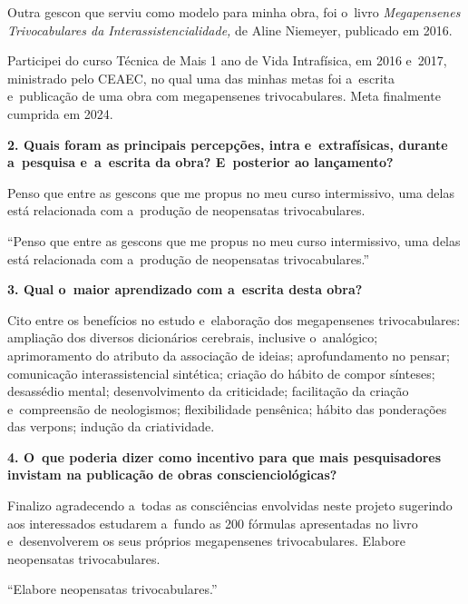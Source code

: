 \documentclass{gescons}
\begin{document}
\begin{multicols}{2}
Outra gescon que serviu como modelo  para minha obra, foi o~livro \textit{Megapensenes Trivocabulares da Interassistencialidade,} de Aline Niemeyer, publicado em 2016.

Participei do curso Técnica de Mais 1 ano de Vida Intrafísica, em 2016 e~2017,  ministrado pelo CEAEC, no qual uma das minhas metas foi a~escrita e~publicação de uma obra com megapensenes trivocabulares. Meta finalmente cumprida em 2024.

\textbf{2.       Quais foram as principais percepções, intra e~extrafísicas, durante a~pesquisa e~a~escrita da obra? E~posterior ao lançamento?}

Penso que entre as gescons que me propus no meu curso intermissivo, uma delas está relacionada com a~produção de neopensatas trivocabulares. 

\begin{pullquote}
    ``Penso que entre as gescons que me propus no meu curso intermissivo, uma delas está relacionada com a~produção de neopensatas trivocabulares.''
\end{pullquote}

\textbf{3.       Qual o~maior aprendizado com a~escrita desta obra?}

Cito entre os benefícios no estudo e~elaboração dos megapensenes trivocabulares: ampliação dos diversos dicionários cerebrais, inclusive o~analógico; aprimoramento do atributo da associação de ideias; aprofundamento no pensar; comunicação interassistencial sintética; criação do hábito de compor sínteses; desassédio mental; desenvolvimento da criticidade; facilitação da criação e~compreensão de neologismos; flexibilidade pensênica; hábito das ponderações das verpons; indução da criatividade.


\textbf{4.       O~que poderia dizer como incentivo para que mais pesquisadores invistam na publicação de obras conscienciológicas?}

Finalizo agradecendo a~todas as consciências envolvidas neste projeto sugerindo aos interessados estudarem a~fundo as 200 fórmulas apresentadas no livro e~desenvolverem os seus próprios megapensenes trivocabulares. Elabore neopensatas trivocabulares.


\begin{pullquote}
``Elabore neopensatas trivocabulares.''
\end{pullquote}
    
    \end{multicols}
\end{document}
